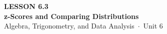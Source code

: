 \documentclass[aspectratio=169, 11pt]{beamer}
\begin{document}
{
\begin{frame}[plain]
  \vspace{2.8cm}\hspace{0.55cm}%
  \begin{minipage}{0.9\textwidth}
    {\color{goldacc}\bfseries\small LESSON 6.3}\\[0.5cm]
    {\color{white}\bfseries\LARGE z-Scores and Comparing Distributions}\\[1.2cm]
    {\color{mistmid}\small Algebra, Trigonometry, and Data Analysis~$\cdot$~Unit 6}
  \end{minipage}
\end{frame}
}

\begin{frame}[t, plain]
\end{frame}
\end{document}
